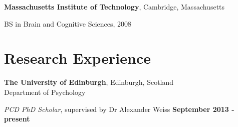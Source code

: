 \documentclass[margin,line]{res}
\newenvironment{list1}{
  \begin{list}{\ding{113}}{%
      \setlength{\itemsep}{0in}
      \setlength{\parsep}{0in} \setlength{\parskip}{0in}
      \setlength{\topsep}{0in} \setlength{\partopsep}{0in} 
      \setlength{\leftmargin}{0.17in}}}{\end{list}}
\begin{document}
\begin{resume}
{\bf Massachusetts Institute of Technology}, Cambridge, Massachusetts\\
\vspace*{-.1in}
\begin{list1}
\item[] BS in Brain and Cognitive Sciences, 2008
\vspace*{.05in}
\end{list1}



\vspace{0.1cm}


\section{\sc Research Experience}

{\bf The University of Edinburgh}, Edinburgh, Scotland \\
Department of Psychology

\vspace{-.2cm}
{\em PCD PhD Scholar}, supervised by Dr Alexander Weiss \hfill {\bf September 2013 - present}\\
\vspace{-.3cm}



\end{resume}
\end{document}
